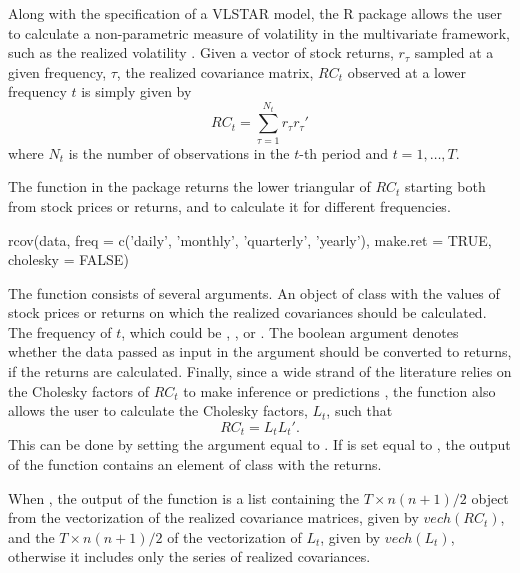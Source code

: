 Along with the specification of a VLSTAR model, the R package  allows the user to calculate a non-parametric measure of volatility in the multivariate framework, such as the realized volatility \citep[see][for the theoretical fundamentals]{abde01, abdl03, bash02}. Given a vector of stock returns, $r_\tau$ sampled at a given frequency, $\tau$, the realized covariance matrix, $RC_t$ observed at a lower frequency $t$ is simply given by
\begin{equation}
	RC_t = \sum_{\tau=1}^{N_t}r_{\tau}r_{\tau}'
\end{equation}
where $N_t$ is the number of observations in the $t$-th period and $t = 1,\ldots, T$. 

The function  in the package  returns the lower triangular of $RC_t$ starting both from stock prices or returns, and to calculate it for different frequencies. 
%
\begin{example}
	rcov(data, freq = c('daily', 'monthly', 'quarterly', 'yearly'), 
	make.ret = TRUE, cholesky = FALSE)
\end{example}
%
The function consists of several arguments. An object of class  with the values of stock prices or returns on which the realized covariances should be calculated. The frequency of $t$, which could be , ,  or . The boolean argument  denotes whether the data passed as input in the argument  should be converted to returns, if  the returns are calculated. Finally, since a wide strand of the literature relies on the Cholesky factors of $RC_t$ to make inference or predictions \citep*[see][for example]{beclo10, chivo11, buparo19, buc20jf}, the function also allows the user to calculate the Cholesky factors, $L_t$, such that 
\begin{equation*}
	RC_t = L_tL_t'.
\end{equation*}
This can be done by setting the argument  equal to . If  is set equal to , the output of the function  contains an element of class  with the returns.

When , the output of the  function is a list containing the $T\times n(n+1)/2$  object from the vectorization of the realized covariance matrices, given by $vech(RC_t)$, and the $T\times n(n+1)/2$ of the vectorization of $L_t$, given by $vech(L_t)$, otherwise it includes only the series of realized covariances.

